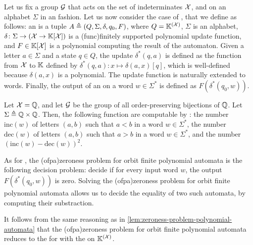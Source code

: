 \AP Let us fix a group $\mathcal{G}$ that acts on the set of indeterminates
$\mathcal{X}$, and on an alphabet $\Sigma$ in an 
fashion. Let us now consider the case of , that we define as follows: an  is a tuple $A \triangleq (Q, \Sigma, \delta, q_0, F)$, where $Q =
\mathbb{K}^{(\mathcal{X})}$, $\Sigma$ is an  alphabet, $\delta \colon
\Sigma \to (\mathcal{X} \to \mathbb{K}[\mathcal{X}])$ is a \kl(func){finitely supported}
polynomial update function, and $F \in \mathbb{K}[\mathcal{X}]$ is a polynomial
computing the result of the automaton. Given a letter $a \in \Sigma$ and a
state $q \in Q$, the update $\delta^*(q,a)$ is defined as the function from
$\mathcal{X}$ to $\mathbb{K}$ defined by $\delta^*(q,a) \colon x \mapsto \delta(a,x)[ q ]$,
which is well-defined because $\delta(a,x)$ is a 
polynomial. The update function is naturally extended to words. Finally, the
output of an  on a word $w \in \Sigma^*$
is defined as $F(\delta^*(q_0, w))$.

\begin{example}
  \label{ex:orbit-finite-polynomial-automata}
  Let $\mathcal{X} = \mathbb{Q}$, and let $\mathcal{G}$ be the group of all
  order-preserving bijections of $\mathbb{Q}$.
  Let $\Sigma \triangleq \mathbb{Q} \times \mathbb{Q}$.
  Then, the following function are computable by 
  :
  the number $\mathrm{inc}(w)$ of letters $(a,b)$ such that $a < b$ in a word $w \in \Sigma^*$,
  the number $\mathrm{dec}(w)$ of letters $(a,b)$ such that $a > b$ in a word $w \in \Sigma^*$,
  and the number $(\mathrm{inc}(w) - \mathrm{dec}(w))^2$.
\end{example}

\AP As for , the \intro(ofpa){zeroness problem} for
orbit finite polynomial automata is the following decision problem: decide if
for every input word $w$, the output $F(\delta^*(q_0, w))$ is zero. Solving the
\kl(ofpa){zeroness problem} for orbit finite polynomial automata allows us to
decide the equality of two such automata, by computing their substraction. 

It follows from the same reasoning as in
\cref{lem:zeroness-problem-polynomial-automata} that the
\kl(ofpa){zeroness problem} for orbit finite polynomial automata reduces to the
 for  with the  on $\mathbb{K}^{(\mathcal{X})}$.

